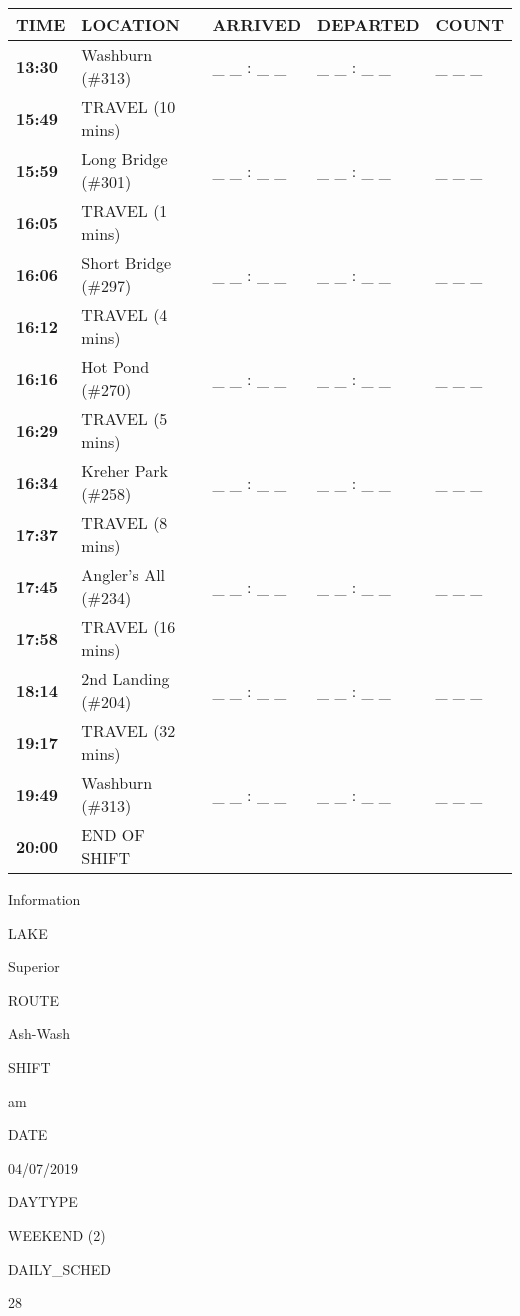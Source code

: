 \documentclass[]{article}
\begin{document}
\begin{tabular}{>{\bfseries}lllll}
\toprule
\textbf{TIME} & \textbf{LOCATION} & \textbf{ARRIVED} & \textbf{DEPARTED} & \textbf{COUNT}\\
\midrule
13:30 & Washburn (\#313) & \_ \_ : \_ \_ & \_ \_ : \_ \_ & \_ \_ \_\\
15:49 & TRAVEL (10 mins) &  &  & \\
15:59 & Long Bridge (\#301) & \_ \_ : \_ \_ & \_ \_ : \_ \_ & \_ \_ \_\\
16:05 & TRAVEL (1 mins) &  &  & \\
16:06 & Short Bridge (\#297) & \_ \_ : \_ \_ & \_ \_ : \_ \_ & \_ \_ \_\\
16:12 & TRAVEL (4 mins) &  &  & \\
16:16 & Hot Pond (\#270) & \_ \_ : \_ \_ & \_ \_ : \_ \_ & \_ \_ \_\\
16:29 & TRAVEL (5 mins) &  &  & \\
16:34 & Kreher Park (\#258) & \_ \_ : \_ \_ & \_ \_ : \_ \_ & \_ \_ \_\\
17:37 & TRAVEL (8 mins) &  &  & \\
17:45 & Angler's All (\#234) & \_ \_ : \_ \_ & \_ \_ : \_ \_ & \_ \_ \_\\
17:58 & TRAVEL (16 mins) &  &  & \\
18:14 & 2nd Landing (\#204) & \_ \_ : \_ \_ & \_ \_ : \_ \_ & \_ \_ \_\\
19:17 & TRAVEL (32 mins) &  &  & \\
19:49 & Washburn (\#313) & \_ \_ : \_ \_ & \_ \_ : \_ \_ & \_ \_ \_\\
20:00 & END OF SHIFT &  &  & \\
\bottomrule
\end{tabular}\newpage

Information

LAKE

Superior

ROUTE

Ash-Wash

SHIFT

am

DATE

04/07/2019

DAYTYPE

WEEKEND (2)

DAILY\_SCHED

28

\vspace{24pt}
\end{document}
